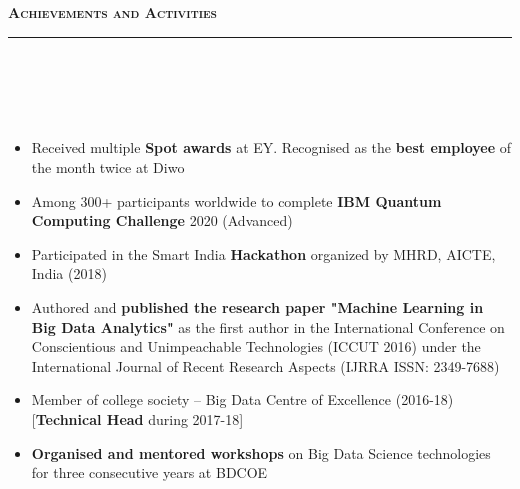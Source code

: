 \documentclass[a4paper,10pt]{article}
\newcommand{\lsep}{-0.5cm}
\newcommand{\resheading}[1]{{\small
        {
            \begin{minipage}
                {0.992\textwidth}\textbf{{\textsc{#1 \vphantom{p\^{E}} }}}
                \\[-0.3cm]
                \hrule
            \end{minipage}
            \\[-0.5cm]
        }
 }}
\begin{document}
\vspace{4pt}
\noindent
\resheading{\textbf{\large Achievements and Activities}}\\[\lsep] 
\\[-0.2cm]
\begin{itemize}

\item Received multiple \textbf{Spot awards} at EY. Recognised as the \textbf{best employee} of the month twice at Diwo \\[-0.55cm]

\item Among 300+ participants worldwide to complete \textbf{IBM Quantum Computing Challenge} 2020 (Advanced) \\[-0.55cm]

\item Participated in the Smart India \textbf{Hackathon} organized by MHRD, AICTE, India (2018) \\[-0.55cm]


\item Authored and \textbf{published the research paper "Machine Learning in Big Data Analytics"} as the first author in the International Conference on Conscientious and Unimpeachable Technologies (ICCUT 2016) under the International Journal of Recent Research Aspects (IJRRA ISSN: 2349-7688) \\[-0.55cm]


\item Member of college society -- Big Data Centre of Excellence (2016-18) [\textbf{Technical Head} during  2017-18] \\[-0.55cm]

\item \textbf{Organised and mentored workshops} on Big Data Science technologies for three consecutive years at BDCOE \\[-0.55cm]





\end{itemize}
\end{document}
